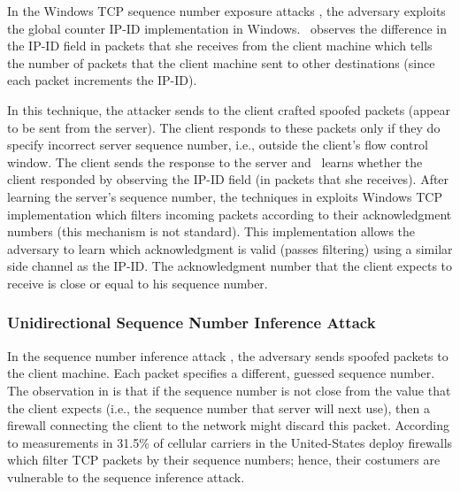 \documentclass[conference]{IEEEtran}
\begin{document}
In the Windows TCP sequence number exposure attacks \cite{woottcp,lkm:phrack:07}, the adversary exploits the global counter IP-ID implementation in Windows. \mal\ observes the difference in the IP-ID field in packets that she receives from the client machine which tells the number of packets that the client machine sent to other destinations (since each packet increments the IP-ID).

In this technique, the attacker sends to the client crafted spoofed packets (appear to be sent from the server). The client responds to these packets only if they do specify incorrect server sequence number, i.e., outside the client's flow control window. The client sends the response to the server and \mal\ learns whether the client responded by observing the IP-ID field (in packets that she receives). After learning the server's sequence number, the techniques in \cite{woottcp,lkm:phrack:07} exploits Windows TCP implementation which filters incoming packets according to their acknowledgment numbers (this mechanism is not standard). This implementation allows the adversary to learn which acknowledgment is valid (passes filtering) using a similar side channel as the IP-ID. The acknowledgment number that the client expects to receive is close or equal to his sequence number.


\subsubsection{Unidirectional Sequence Number Inference Attack}
In the sequence number inference attack \cite{snptcp}, the adversary sends spoofed packets to the client machine. Each packet specifies a different, guessed sequence number. The observation in \cite{snptcp} is that if the sequence number is not close from the value that the client expects (i.e., the sequence number that server will next use), then a firewall connecting the client to the network might discard this packet. According to measurements in \cite{snptcp} 31.5\% of cellular carriers in the United-States deploy firewalls which filter TCP packets by their sequence numbers; hence, their costumers are vulnerable to the sequence inference attack.
\end{document}
